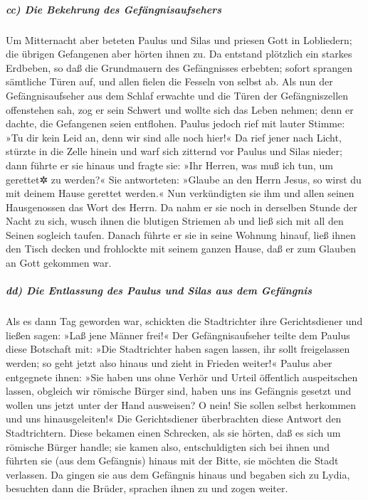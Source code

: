 \hypertarget{cc-die-bekehrung-des-gefuxe4ngnisaufsehers}{%
\subparagraph{cc) Die Bekehrung des
Gefängnisaufsehers}\label{cc-die-bekehrung-des-gefuxe4ngnisaufsehers}}

 Um Mitternacht aber beteten Paulus und Silas und priesen
Gott in Lobliedern; die übrigen Gefangenen aber hörten ihnen zu.
 Da entstand plötzlich ein starkes Erdbeben, so daß die
Grundmauern des Gefängnisses erbebten; sofort sprangen sämtliche Türen
auf, und allen fielen die Fesseln von selbst ab.  Als nun
der Gefängnisaufseher aus dem Schlaf erwachte und die Türen der
Gefängniszellen offenstehen sah, zog er sein Schwert und wollte sich das
Leben nehmen; denn er dachte, die Gefangenen seien entflohen.
 Paulus jedoch rief mit lauter Stimme: »Tu dir kein Leid
an, denn wir sind alle noch hier!«  Da rief jener nach
Licht, stürzte in die Zelle hinein und warf sich zitternd vor Paulus und
Silas nieder;  dann führte er sie hinaus und fragte sie:
»Ihr Herren, was muß ich tun, um gerettet✲ zu werden?« 
Sie antworteten: »Glaube an den Herrn Jesus, so wirst du mit deinem
Hause gerettet werden.«  Nun verkündigten sie ihm und
allen seinen Hausgenossen das Wort des Herrn.  Da nahm er
sie noch in derselben Stunde der Nacht zu sich, wusch ihnen die blutigen
Striemen ab und ließ sich mit all den Seinen sogleich taufen.
 Danach führte er sie in seine Wohnung hinauf, ließ ihnen
den Tisch decken und frohlockte mit seinem ganzen Hause, daß er zum
Glauben an Gott gekommen war.

\hypertarget{dd-die-entlassung-des-paulus-und-silas-aus-dem-gefuxe4ngnis}{%
\subparagraph{dd) Die Entlassung des Paulus und Silas aus dem
Gefängnis}\label{dd-die-entlassung-des-paulus-und-silas-aus-dem-gefuxe4ngnis}}

 Als es dann Tag geworden war, schickten die Stadtrichter
ihre Gerichtsdiener und ließen sagen: »Laß jene Männer frei!«
 Der Gefängnisaufseher teilte dem Paulus diese Botschaft
mit: »Die Stadtrichter haben sagen lassen, ihr sollt freigelassen
werden; so geht jetzt also hinaus und zieht in Frieden weiter!«
 Paulus aber entgegnete ihnen: »Sie haben uns ohne Verhör
und Urteil öffentlich auspeitschen lassen, obgleich wir römische Bürger
sind, haben uns ins Gefängnis gesetzt und wollen uns jetzt unter der
Hand ausweisen? O nein! Sie sollen selbst herkommen und uns
hinausgeleiten!«  Die Gerichtsdiener überbrachten diese
Antwort den Stadtrichtern. Diese bekamen einen Schrecken, als sie
hörten, daß es sich um römische Bürger handle;  sie kamen
also, entschuldigten sich bei ihnen und führten sie (aus dem Gefängnis)
hinaus mit der Bitte, sie möchten die Stadt verlassen. 
Da gingen sie aus dem Gefängnis hinaus und begaben sich zu Lydia,
besuchten dann die Brüder, sprachen ihnen zu und zogen weiter.

